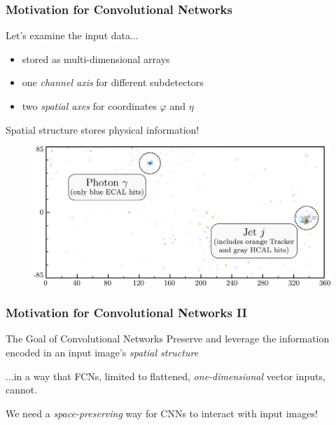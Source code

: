 \documentclass[14pt, t]{beamer}
\begin{document}
\begin{frame}
    \frametitle{Motivation for Convolutional Networks}

    Let's examine the input data...
    \begin{itemize}
    
        \item stored as multi-dimensional arrays

        \item one \textit{channel axis} for different subdetectors

        \item two \textit{spatial axes} for coordinates $ \varphi $ and $ \eta $
    
    \end{itemize}
    \vspace{2mm}
    Spatial structure stores physical information!

    \begin{figure}[htb!]
        \centering
        \includegraphics[width=0.85\linewidth]{raster/raster-svg/event-image-cropped}
    \end{figure}   
    
\end{frame}


\begin{frame}
    \frametitle{Motivation for Convolutional Networks II}

    \begin{block}{The Goal of Convolutional Networks}
        Preserve and leverage the information encoded in an input image’s \textit{spatial structure}
    \end{block}
    \hspace{2mm} ...in a way that FCNs, limited to flattened, \textit{one-dimensional} vector inputs, cannot.

    \pause
    \vspace{5mm}
    \begin{center}
        {\large We need a \textit{space-preserving} way for CNNs to interact with input images!}
    \end{center}
    

\end{frame}
\end{document}
